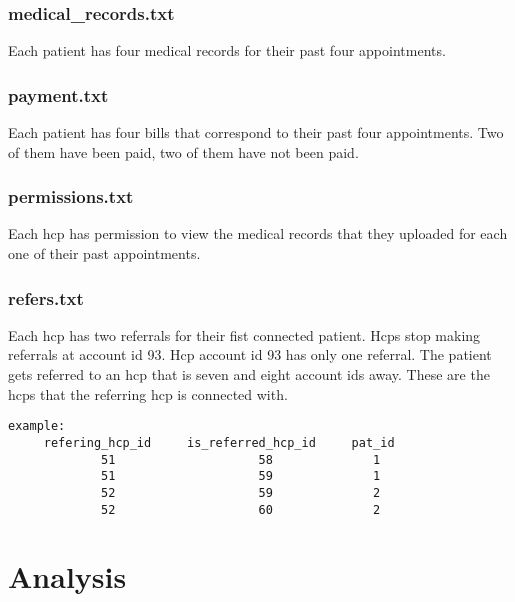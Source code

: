 \subsection{medical\_records.txt}
Each patient has four medical records for their past four appointments.

\subsection{payment.txt}
Each patient has four bills that correspond to their past four appointments.  Two of them have been paid, two of them have not been paid.

\subsection{permissions.txt}
Each hcp has permission to view the medical records that they uploaded for each one of their past appointments.

\subsection{refers.txt}
Each hcp has two referrals for their fist connected patient.  Hcps stop making referrals at account id 93.  Hcp account id 93 has only one referral.  The patient gets referred to an hcp that is seven and eight account ids away. These are the hcps that the referring hcp is connected with.
\begin{verbatim}
example:
     refering_hcp_id     is_referred_hcp_id     pat_id	
             51                    58              1
             51                    59              1
             52                    59              2
             52                    60              2
\end{verbatim}

\chapter{Analysis}